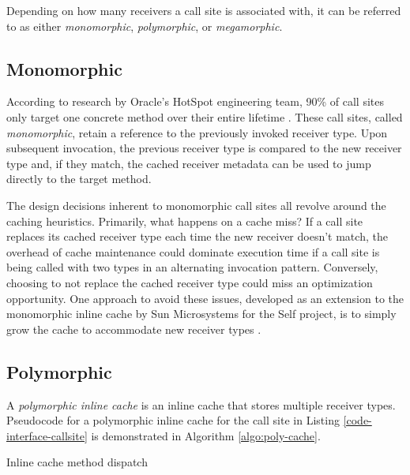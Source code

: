 Depending on how many receivers a call site is associated with, it can be referred to as either \emph{monomorphic}, \emph{polymorphic}, or \emph{megamorphic}.
 
\subsection{Monomorphic}

According to research by Oracle's HotSpot engineering team, 90\% of call sites only target one concrete method over their entire lifetime \cite{hotspot-virtualcalls}.  These call sites, called \emph{monomorphic}, retain a reference to the previously invoked receiver type.  Upon subsequent invocation, the previous receiver type is compared to the new receiver type and, if they match, the cached receiver metadata can be used to jump directly to the target method.

The design decisions inherent to monomorphic call sites all revolve around the caching heuristics.  Primarily, what happens on a cache miss?  If a call site replaces its cached receiver type each time the new receiver doesn't match, the overhead of cache maintenance could dominate execution time if a call site is being called with two types in an alternating invocation pattern.  Conversely, choosing to not replace the cached receiver type could miss an optimization opportunity.  One approach to avoid these issues, developed as an extension to the monomorphic inline cache by Sun Microsystems for the Self project, is to simply grow the cache to accommodate new receiver types \cite{self-pic}.

\subsection{Polymorphic}

A \emph{polymorphic inline cache} is an inline cache that stores multiple receiver types.  Pseudocode for a polymorphic inline cache for the call site in Listing \ref{code-interface-callsite} is demonstrated in Algorithm \ref{algo:poly-cache}.

\begin{flushright}
\begin{algorithm}[H]
 \SetAlgoLined
 \label{algo:poly-cache}
 \caption{Inline cache method dispatch}
\end{algorithm}
\end{flushright}

